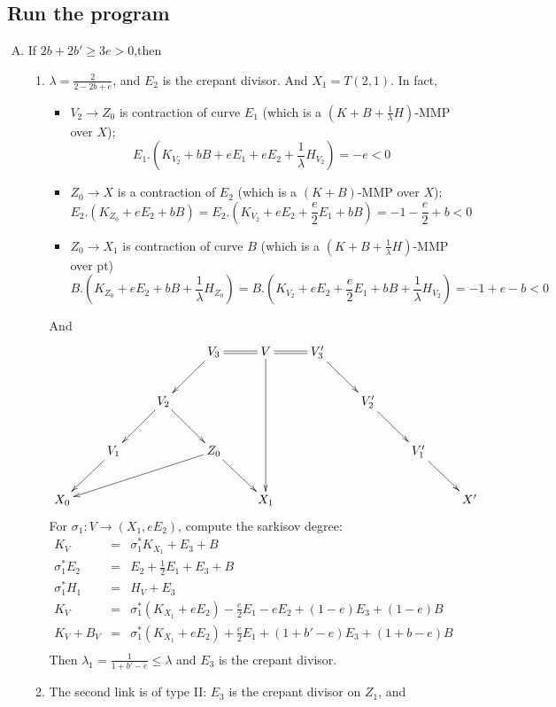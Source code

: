 \documentclass{article}
\begin{document}
\subsection{Run the program}
\begin{enumerate}[(A)]
  \item If $ 2b+2b'\geqslant 3e>0 $,then
  \begin{enumerate}[(1)]
    \item  $ \lambda=\frac{2}{2-2b+e} $, and $ E_2 $ is the crepant divisor. And $ X_1=T(2,1) $. In fact,
    \begin{itemize}
      \item $ V_2\to Z_0 $ is contraction of curve $ E_1 $ (which is a $ (K+B+\frac{1}{\lambda}H) $-MMP over $ X $);
      $$ E_1.(K_{V_2}+bB+eE_1+eE_2+\frac{1}{\lambda}H_{V_2})=-e<0 $$
      \item $ Z_0\to X $ is a contraction of $ E_2 $ (which is a  $ (K+B) $-MMP over $ X $);
      $$ E_2.(K_{Z_0}+eE_2+bB)=E_2.(K_{V_2}+eE_2+\frac{e}{2}E_1+bB)=-1-\frac{e}{2}+b<0 $$
      \item $ Z_0\to X_1 $ is contraction of curve $ B $ (which is a $ (K+B+\frac{1}{\lambda}H) $-MMP over pt)
      $$ B.(K_{Z_0}+eE_2+bB+\frac{1}{\lambda}H_{Z_0})=B.(K_{V_2}+eE_2+\frac{e}{2}E_1+bB+\frac{1}{\lambda}H_{V_2})=-1+e-b<0 $$
    \end{itemize} 
    And
    $$ \xymatrix{&&&V_3\ar[ld]\ar@{=}[r]&V\ar[ddd]\ar@{=}[r]&V_3'\ar[rd]\\
      &&V_2\ar[ld]\ar[rd]&&&&V_2'\ar[rd]\\
      &V_1\ar[ld]&&Z_0\ar[llld]\ar[rd]&&&&V_1'\ar[rd]\\
      X_0&&&&X_1&&&&X'
      } $$
    For $ \sigma_1:V\to (X_1,eE_2) $, compute the sarkisov degree:
    $$ \begin{array}{rcl}
      K_V&=&\sigma_1^*K_{X_1}+E_3+B \\
      \sigma_1^*E_2&=&E_2+\frac{1}{2}E_1+E_3+B\\
      \sigma_1^*H_1&=&H_V+E_3\\
      K_V&=&\sigma_1^*(K_{X_1}+eE_2)-\frac{e}{2}E_1-eE_2+(1-e)E_3+(1-e)B\\
      K_V+B_V&=&\sigma_1^*(K_{X_1}+eE_2)+\frac{e}{2}E_1+(1+b'-e)E_3+(1+b-e)B\\
    \end{array} $$
    Then $ \lambda_1=\frac{1}{1+b'-e} \leqslant \lambda $ and $ E_3 $ is the crepant divisor.
    \item The second link is of type II: $ E_3 $ is the crepant divisor on $ Z_1 $, and

\end{enumerate}
\end{enumerate}
\end{document}
